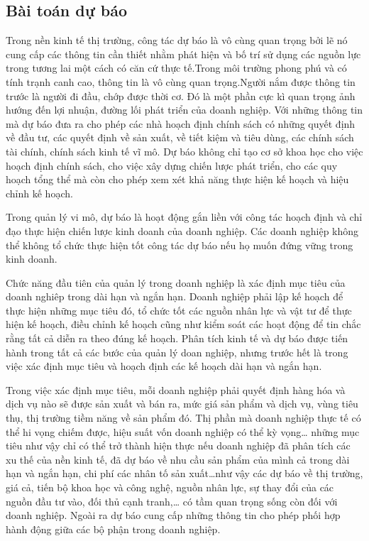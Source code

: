 \documentclass[twoside,12pt]{Latex/Classes/PhDthesisPSnPDF}
\begin{document}
\subsection{Bài toán dự báo}
Trong nền kinh tế thị trường, công tác dự báo là vô cùng quan trọng bởi lẽ nó cung cấp các thông tin cần thiết nhằm phát hiện và bố trí sử dụng các nguồn lực trong tương lai một cách có căn cứ thực tế.Trong môi trường phong phú và có tính trạnh canh cao, thông tin là vô cùng quan trọng.Người nắm được thông tin trước là người đi đầu, chớp được thời cơ. Đó là một phần cực kì quan trọng ảnh hướng đến lợi nhuận, đường lối phát triển của doanh nghiệp. Với những thông tin mà dự báo đưa ra cho phép các nhà hoạch định chính sách có những quyết định về đầu tư, các quyết định về sản xuất, về tiết kiệm và tiêu dùng, các chính sách tài chính, chính sách kinh tế vĩ mô. Dự báo không chỉ tạo cơ sở khoa học cho việc hoạch định chính sách, cho việc xây dựng chiến lược phát triển, cho các quy hoạch tổng thể mà còn cho phép xem xét khả năng thực hiện kế hoạch và hiệu chỉnh kế hoạch.

Trong quản lý vi mô, dự báo là hoạt động gắn liền với công tác hoạch định và chỉ đạo thực hiện chiến lược kinh doanh của doanh nghiệp. Các doanh nghiệp không thể không tổ chức thực hiện tốt công tác dự báo nếu họ muốn đứng vững trong kinh doanh.

Chức năng đầu tiên của  quản lý trong doanh nghiệp là xác định mục tiêu của doanh nghiêp trong dài hạn và ngắn hạn. Doanh nghiệp phải lập kế hoạch để thực hiện những mục tiêu đó, tổ chức tốt các nguồn nhân lực và vật tư để thực hiện kế hoạch, điều chỉnh kế hoạch cũng như kiểm soát các hoạt động để tin chắc rằng tất cả diễn ra theo đúng kế hoạch. Phân tích kinh tế và dự báo được tiến hành trong tất cả các bước của quản lý doan nghiệp, nhưng trước hết là trong việc xác định mục tiêu và hoạch định các kế hoạch dài hạn và ngắn hạn.

Trong việc xác định mục tiêu, mỗi doanh nghiệp phải quyết định hàng hóa và dịch vụ nào sẽ được sản xuất và bán ra, mức giá sản phẩm và dịch vụ, vùng tiêu thụ, thị trường tiềm năng về sản phẩm đó. Thị phần mà doanh nghiệp thực tế có thể hi vọng chiếm được, hiệu suất vốn doanh nghiệp có thể kỳ vọng… những mục tiêu như vậy chỉ có thể trở thành hiện thực nếu doanh nghiệp đã phân tích các xu thế của nền kinh tế, đã dự báo về nhu cầu sản phẩm của mình cả trong dài hạn và ngắn hạn, chi phí các nhân tố sản xuất…như vậy các dự báo về thị trường, giá cả, tiến bộ khoa học và công nghệ, nguồn nhân lực, sự thay đổi của các nguồn đầu tư vào, đối thủ cạnh tranh,… có tầm quan trọng sống còn đối với doanh nghiệp. Ngoài ra dự báo cung cấp những thông tin cho phép phối hợp hành động giữa các bộ phận trong doanh nghiệp.
\end{document}
